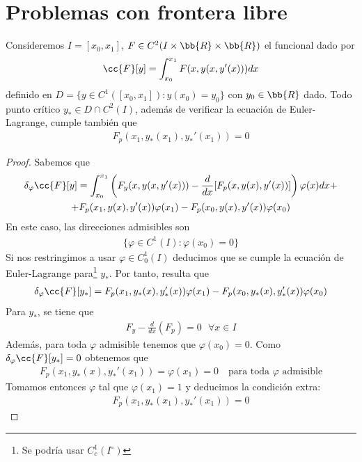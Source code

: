 \section{Problemas con frontera libre}

\begin{teo}
    Consideremos $I=[x_0, x_1]$, $F\in C^2(I\times \bb{R} \times \bb{R})$ el funcional dado por 
    \begin{gather*}
        \cc{F}[y] = \int_{x_0}^{x_1} F(x,y(x, y'(x))) dx
    \end{gather*}
    definido en $D = \{y\in C^1([x_0, x_1]) : y(x_0) = y_0\}$ con $y_0\in \bb{R}$ dado. Todo punto crítico $y_*\in D\cap C^2(I)$, además de verificar la ecuación de Euler-Lagrange, cumple también que 
    \begin{gather*}
        F_p(x_1, y_*(x_1), y_*'(x_1)) = 0
    \end{gather*} 
    \begin{proof}
        Sabemos que
        \begin{gather*}
            \delta_\varphi \cc{F}[y] = \int_{x_0}^{x_1} \left(F_y(x,y(x, y'(x))) -\frac{d}{dx}[F_p(x,y(x), y'(x))]\right)\varphi(x) dx +\\
            + F_p(x_1, y(x), y'(x))\varphi(x_1) - F_p(x_0, y(x), y'(x))\varphi(x_0)
        \end{gather*}
        En este caso, las direcciones admisibles son
        \begin{gather*}
            \{\varphi \in C^1(I) : \varphi(x_0)=0\}
        \end{gather*}
        Si nos restringimos a usar $\varphi\in C_0^1(I)$ deducimos que se cumple la ecuación de Euler-Lagrange para\footnote{Se podría usar $C_c^1(I^\circ)$} $y_*$. Por tanto, resulta que 
        \begin{gather*}
            \delta_\varphi \cc{F}[y_*] = F_p(x_1, y_*(x), y_*'(x))\varphi(x_1) - F_p(x_0, y_*(x), y_*'(x))\varphi(x_0)
        \end{gather*}
        Para $y_*$, se tiene que 
        \begin{gather*}
            F_y - \frac{d}{dx}(F_p) = 0 \ \ \ \forall x \in I
        \end{gather*}
        Además, para toda $\varphi$ admisible tenemos que $\varphi(x_0)=0$. Como $\delta_\varphi\cc{F}[y_*] = 0$ obtenemos que 
        \begin{gather*}
            F_p(x_1, y_*(x), y_*'(x_1)) = \varphi(x_1) = 0 \ \ \ \text{ para toda $\varphi$ admisible}
        \end{gather*}
        Tomamos entonces $\varphi$ tal que $\varphi(x_1)=1$ y deducimos la condición extra:
        \begin{gather*}
            F_p(x_1, y_*(x_1), y_*'(x_1)) = 0
        \end{gather*}
    \end{proof}
\end{teo}

